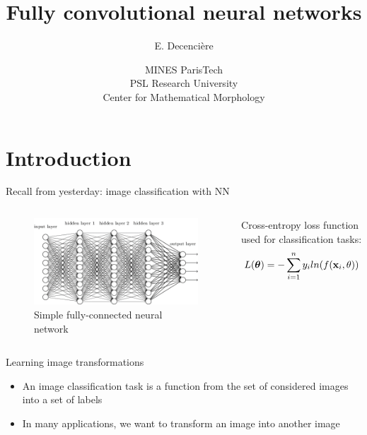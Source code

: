 \documentclass[xcolor=pdftex,dvipsnames,table,mathserif]{beamer}
\title{Fully convolutional neural networks}
\author{E. Decencière}
\date{MINES ParisTech\\
  PSL Research University\\
  Center for Mathematical Morphology
}
\begin{document}
\frame{\titlepage}


\section{Introduction}


\begin{frame}{Recall from yesterday: image classification with NN}

\begin{columns}

  \begin{column}{.5\textwidth}
    \begin{figure}[ht]
      \centering
      \includegraphics[width=\textwidth]{network.png}\\
       Simple fully-connected neural network
    \end{figure}
  \end{column}

  \begin{column}{.5\textwidth}
    Cross-entropy loss function used for classification tasks:
    \[
        L(\boldsymbol{\theta}) = -\sum\limits_{i=1}^n y_i ln( f(\mathbf{x}_i, \theta) )
    \]
  \end{column}
\end{columns}

\end{frame}


\begin{frame}{Learning image transformations}

  \begin{itemize}
  \item An image classification task is a function from the set of considered images into a set of labels
  \item In many applications, we want to transform an image into another image
  \end{itemize}

\end{frame}
\end{document}

